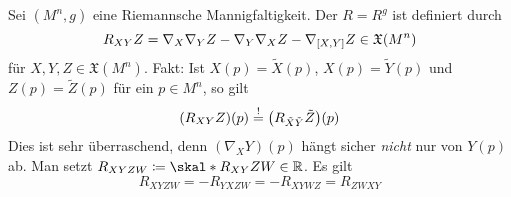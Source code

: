\begin{erinnerung}[{name=[Krümmungstensor]}]
	Sei $(M^n,g)$ eine Riemannsche Mannigfaltigkeit.
	Der  $R=R^g$ ist definiert durch
	\[
		R_{XY}Z = \nabla_X \nabla_Y Z - \nabla_Y \nabla_X Z - \nabla_{\benbrace*{X,Y}} Z \in \mathfrak{X}(M^n)
	\] 
	für $X,Y,Z \in \mathfrak{X}(M^n)$.
	Fakt: Ist $X(p) = \tilde{X}(p)$, $X(p) = \tilde{Y}(p)$ und $Z(p) = \tilde{Z}(p)$ für ein $p \in M^n$, so gilt
	\[
		(R_{XY}Z)(p) \stackrel{!}{=} \enbrace*{R_{\tilde{X} \tilde{Y}} \tilde{Z}}(p)
	\]
	Dies ist sehr überraschend, denn $(\nabla_X Y)(p)$ hängt sicher \emph{nicht} nur von $Y(p)$ ab.
	Man setzt $R_{XYZW} \coloneqq \skal*{R_{XY} Z}{W} \in \mathbb{R}$. Es gilt
	\[
		R_{XYZW} = - R_{YXZW} = -R_{XYWZ} = R_{ZWXY}
	\]
\end{erinnerung}

